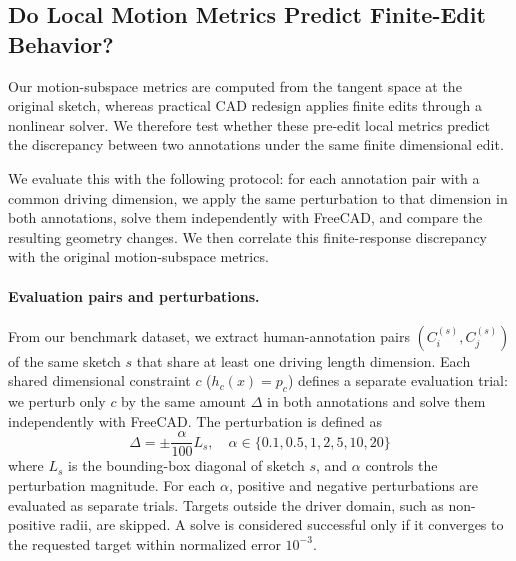 

\subsection{Do Local Motion Metrics Predict Finite-Edit Behavior?}
\label{sec:appendix_consistency_with_finite_edit_behavior}

Our motion-subspace metrics are computed from the tangent space at the original sketch, whereas practical CAD redesign applies finite edits through a nonlinear solver. We therefore test whether these pre-edit local metrics predict the discrepancy between two annotations under the same finite dimensional edit.

We evaluate this with the following protocol: for each annotation pair with a common driving dimension, we apply the same perturbation to that dimension in both annotations, solve them independently with FreeCAD, and compare the resulting geometry changes. We then correlate this finite-response discrepancy with the original motion-subspace metrics.

\paragraph{Evaluation pairs and perturbations.}
From our benchmark dataset, we extract human-annotation pairs $(C^{(s)}_i, C^{(s)}_j)$ of the same sketch $s$ that share at least one driving length dimension. Each shared dimensional constraint $c$ ($h_c(x)=p_c$) defines a separate evaluation trial: we perturb only $c$ by the same amount $\Delta$ in both annotations and solve them independently with FreeCAD. The perturbation is defined as
\begin{equation}
\Delta=\pm\frac{\alpha}{100}L_s,\quad\alpha\in\{0.1,0.5,1,2,5,10,20\}
\end{equation}
where $L_s$ is the bounding-box diagonal of sketch $s$, and $\alpha$ controls the perturbation magnitude. For each $\alpha$, positive and negative perturbations are evaluated as separate trials. Targets outside the driver domain, such as non-positive radii, are skipped. A solve is considered successful only if it converges to the requested target within normalized error $10^{-3}$.


